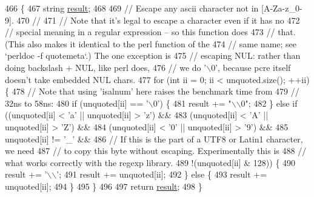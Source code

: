 \begin{DoxyCode}
466                                                   \{
467   \textcolor{keywordtype}{string} \hyperlink{group__APACHE__CORE__MPM_ga9f5959dd76d5c83e775dcf44de684686}{result};
468 
469   \textcolor{comment}{// Escape any ascii character not in [A-Za-z\_0-9].}
470   \textcolor{comment}{//}
471   \textcolor{comment}{// Note that it's legal to escape a character even if it has no}
472   \textcolor{comment}{// special meaning in a regular expression -- so this function does}
473   \textcolor{comment}{// that.  (This also makes it identical to the perl function of the}
474   \textcolor{comment}{// same name; see `perldoc -f quotemeta`.)  The one exception is}
475   \textcolor{comment}{// escaping NUL: rather than doing backslash + NUL, like perl does,}
476   \textcolor{comment}{// we do '\(\backslash\)0', because pcre itself doesn't take embedded NUL chars.}
477   \textcolor{keywordflow}{for} (\textcolor{keywordtype}{int} ii = 0; ii < unquoted.size(); ++ii) \{
478     \textcolor{comment}{// Note that using 'isalnum' here raises the benchmark time from}
479     \textcolor{comment}{// 32ns to 58ns:}
480     \textcolor{keywordflow}{if} (unquoted[ii] == \textcolor{charliteral}{'\(\backslash\)0'}) \{
481       result += \textcolor{stringliteral}{"\(\backslash\)\(\backslash\)0"};
482     \} \textcolor{keywordflow}{else} \textcolor{keywordflow}{if} ((unquoted[ii] < \textcolor{charliteral}{'a'} || unquoted[ii] > \textcolor{charliteral}{'z'}) &&
483                (unquoted[ii] < \textcolor{charliteral}{'A'} || unquoted[ii] > \textcolor{charliteral}{'Z'}) &&
484                (unquoted[ii] < \textcolor{charliteral}{'0'} || unquoted[ii] > \textcolor{charliteral}{'9'}) &&
485                unquoted[ii] != \textcolor{charliteral}{'\_'} &&
486                \textcolor{comment}{// If this is the part of a UTF8 or Latin1 character, we need}
487                \textcolor{comment}{// to copy this byte without escaping.  Experimentally this is}
488                \textcolor{comment}{// what works correctly with the regexp library.}
489                !(unquoted[ii] & 128)) \{
490       result += \textcolor{charliteral}{'\(\backslash\)\(\backslash\)'};
491       result += unquoted[ii];
492     \} \textcolor{keywordflow}{else} \{
493       result += unquoted[ii];
494     \}
495   \}
496 
497   \textcolor{keywordflow}{return} \hyperlink{group__APACHE__CORE__MPM_ga9f5959dd76d5c83e775dcf44de684686}{result};
498 \}
\end{DoxyCode}


